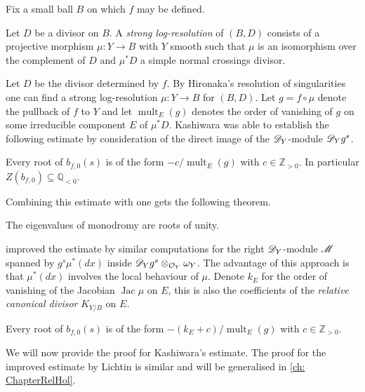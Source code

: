 Fix a small ball $B$ on which $f$ may be defined.
\begin{definition}
  Let $D$ be a divisor on $B$.
  A {\it strong log-resolution} of $(B,D)$ consists of a projective morphism $\mu:Y\to B$  with $Y$ smooth such that $\mu$ is an isomorphism over the complement of $D$ and $\mu^*D$ a simple normal crossings divisor.
\end{definition}
Let $D$ be the divisor determined by $f$.
By Hironaka's resolution of singularities one can find a strong log-resolution $\mu:Y\to B$ for $(B,D)$.
Let $g = f\circ \mu$ denote the pullback of $f$ to $Y$ and let $\operatorname{mult}_{E}(g)$ denotes the order of vanishing of $g$ on some irreducible component $E$ of $\mu^*D$.
Kashiwara was able to establish the following estimate by consideration of the direct image of the $\mathscr{D}_Y$-module $\mathscr{D}_Y g^s$.
\begin{theorem}{\cite[Corollary 5.2]{kashiwara1976b}}
  Every root of $b_{f,0}(s)$ is of the form $ -c/\operatorname{mult}_{E}(g) $ with $c\in \mathbb{Z}_{>0}$.
  In particular $Z(b_{f,0})\subseteq \mathbb{Q}_{<0}$.
\end{theorem}
Combining this estimate with  one gets the following theorem.
\begin{theorem}
  The eigenvalues of monodromy are roots of unity.
\end{theorem}
\cite{lichtin1989poles} improved the estimate by similar computations for the right $\mathscr{D}_Y$-module $\mathscr{M}$ spanned by $g^s \mu^*(dx)$ inside $\mathscr{D}_Yg^s\otimes_{\mathcal{O}_Y} \omega_Y$.
The advantage of this approach is that $\mu^*(dx)$ involves the local behaviour of $\mu$.
Denote $k_E$ for the order of vanishing of the Jacobian $\operatorname{Jac}\mu$ on $E$, this is also the coefficients of the {\it relative canonical divisor} $K_{Y/B}$ on $E$.
\begin{theorem}{\cite[Theorem 5]{lichtin1989poles}}\label{thm: LichtinEstimate}
  Every root of $b_{f,0}(s)$ is of the form $-(k_E + c)/\operatorname{mult}_{E}(g)$ with $c\in \mathbb{Z}_{>0}$.
\end{theorem}
We will now provide the proof for Kashiwara's estimate. 
The proof for the improved estimate by Lichtin is similar and will be generalised in \cref{ch: ChapterRelHol}.
\\

